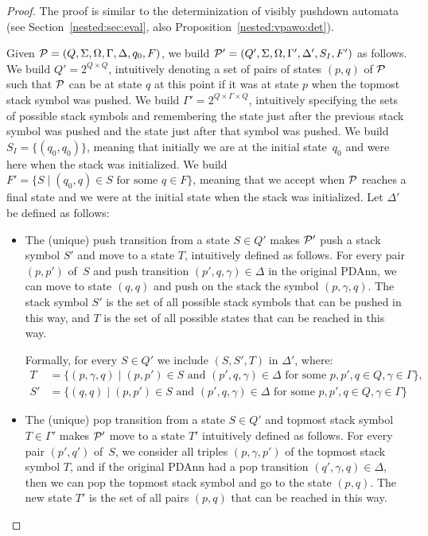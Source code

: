 \begin{proof}
  The proof is similar to the determinization of visibly pushdown
  automata (see Section~\ref{nested:sec:eval}, also Proposition~\ref{nested:vpawo:det}).

  Given $\mathcal{P} = (Q, \Sigma, \Omega, \Gamma, \Delta, q_0, F)$,
        we build $\mathcal{P}' = (Q', \Sigma, \Omega, \Gamma', \Delta', S_I, F')$ as
        follows.
	We build $Q' = 2^{Q\times Q}$, intuitively denoting a set of pairs of
        states $(p, q)$ of $\mathcal{P}$ such that $\mathcal{P}$ can be at state $q$ at this
        point if it was at state $p$ when the topmost stack symbol was pushed. 
        We build $\Gamma' = 2^{Q\times\Gamma\times Q}$,
        intuitively specifying the sets of possible stack symbols and
        remembering the state just after the previous stack symbol was pushed
        and the state just after that symbol was pushed.
	We build $S_I = \{(q_0,q_0)\}$, meaning that initially we are at
        the initial state~$q_0$ and were here when the stack was initialized.
        We build
        $F' = \{S\mid (q_0,q)\in S\text{ for some }q\in F \}$,
        meaning that we accept when $\mathcal{P}$ reaches a final
        state and we were at the initial state when the stack was initialized.
	Let $\Delta'$ be defined as follows:
	\begin{itemize}
          \item The (unique) push transition from a state $S \in Q'$ 
                  makes $\mathcal{P}'$ push a stack symbol $S'$ and move to a state $T$,
                  intuitively defined as follows. For every pair $(p, p')$
                  of~$S$ and push transition $(p', q, \gamma) \in \Delta$ in the original PDAnn,
                  we can move to state $(q, q)$ and push on the stack the symbol
                  $(p, \gamma, q)$. The stack symbol $S'$ is the set of all
                  possible stack symbols that can be pushed in this way, and
                  $T$ is the set of all possible states that can be reached in
                  this way.

                  Formally, 
                  for every $S\in Q'$ we include $(S, S', T)$ in $\Delta'$, where:
		\begin{align*}
			T &= \{(p,\gamma,q)\mid (p,p')\in S \text{ and } (p',q,\gamma)\in\Delta\text{ for some }p,p',q\in Q, \gamma\in\Gamma \},\\
			S'&= \{(q,q)\mid(p,p')\in S\text{ and }(p',q,\gamma)\in\Delta\text{ for some }p,p',q\in Q,  \gamma\in\Gamma\}
		\end{align*}
              \item The (unique) pop transition from a state $S \in Q'$ and topmost
                stack symbol $T \in \Gamma'$ makes $\mathcal{P}'$ move to a state $T'$
                intuitively defined as follows. For every pair $(p', q')$ of~$S$,
                we consider all triples $(p, \gamma, p')$ of the topmost stack
                symbol $T$, and if the original PDAnn had a pop transition $(q',
                \gamma, q) \in \Delta$, then we can pop the topmost stack symbol
                and go to the state $(p, q)$. The new state $T'$ is the set of
                all pairs $(p, q)$ that can be reached in this way.


\end{itemize}
\end{proof}
